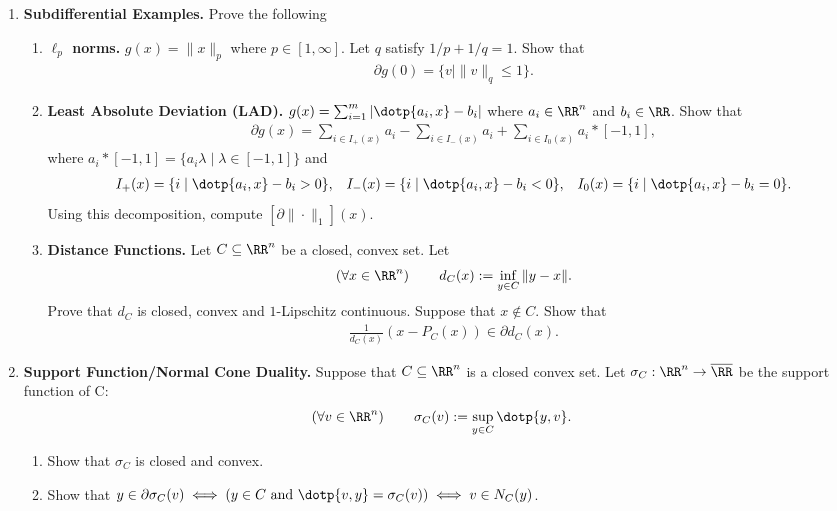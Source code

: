 \documentclass[11pt]{article}
\begin{document}
\newcommand{\Tcp}{T_{\mathrm{CP}}}
\begin{enumerate}
\item \textbf{Subdifferential Examples.} Prove the following
\begin{enumerate}
\item \textbf{$\ell_p$ norms.} $g(x) = \|x\|_p$ where $p \in [1, \infty]$. Let $q$ satisfy $1/p + 1/q = 1$. Show that 
\begin{align*}
\partial g(0) = \{v \mid \|v\|_q \leq 1\} .
\end{align*}
\item \textbf{Least Absolute Deviation (LAD).} $g(x) = \sum_{i=1}^m |\dotp{a_i, x} - b_i|$ where $a_i \in \RR^n$ and $b_i \in \RR$. Show that 
\begin{align*}
\partial g(x) = \sum_{i\in I_+(x)} a_i - \sum_{i \in I_-(x)} a_i + \sum_{i\in I_0(x)}a_i *[-1, 1],
\end{align*}
where $a_i * [-1, 1] = \{a_i \lambda \mid \lambda \in [-1, 1]\}$ and
\begin{align*}
I_+(x) = \{i \mid \dotp{a_i, x} - b_i > 0\}, && I_-(x) = \{i \mid \dotp{a_i, x} - b_i < 0\},  && I_0(x) = \{i \mid \dotp{a_i, x} - b_i = 0\} .
\end{align*}
Using this decomposition, compute $[\partial \|\cdot\|_1] (x)$.
\item \textbf{Distance Functions.} Let $C \subseteq \RR^n$ be a closed, convex set. Let 
$$
\left(\forall x \in \RR^n\right) \qquad d_C(x) := \inf_{y \in C} \|y - x\|.
$$
Prove that $d_C$ is closed, convex and $1$-Lipschitz continuous. Suppose that $x \notin C$. Show that 
\begin{align*}
\frac{1}{d_C(x)}(x - P_C(x)) \in \partial d_C(x).
\end{align*}
\end{enumerate} 
\item \textbf{Support Function/Normal Cone Duality.} Suppose that $C \subseteq \RR^n$ is a closed convex set. Let $\sigma_C : \RR^n \rightarrow \overline{\RR}$ be the support function of C:
\begin{align*}
\left(\forall v \in \RR^n\right) \qquad \sigma_C(v) := \sup_{y \in C} \dotp{y, v}.
\end{align*}
\begin{enumerate}
\item Show that $\sigma_C$ is closed and convex. 
\item Show that  $y \in \partial \sigma_C(v) \iff (y \in C \text{ and } \dotp{v, y} = \sigma_C(v)) \iff v \in N_C(y)$.

\end{enumerate}
\end{enumerate}
\end{document}
